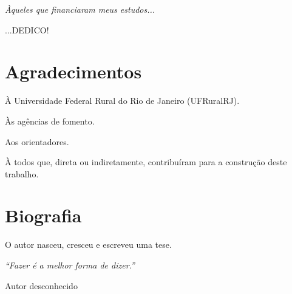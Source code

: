 \documentclass[tese]{UFRuralRJ}
\author{Rural}{Nome da Melhor Estudante da} %
\date{30}{Fevereiro}{2016} %
\begin{document}
\maketitle

\makeapprove

\clearpage\mbox{}\vfill\hspace{80mm}
\begin{minipage}{76mm}
  \begin{flushright}
    {\em
    Àqueles que financiaram meus estudos...
    \par
    ...DEDICO!
    }
  \end{flushright}
\end{minipage}

\chapter*{Agradecimentos}

À Universidade Federal Rural do Rio de Janeiro (UFRuralRJ).

Às agências de fomento.

Aos orientadores.

À todos que, direta ou indiretamente, contribuíram para a construção deste 
trabalho.

\chapter*{Biografia}
O autor nasceu, cresceu e escreveu uma tese.

\clearpage\mbox{}\vfill\hspace{80mm}\begin{minipage}{76mm}\begin{flushright}{\em
``Fazer é a melhor forma de dizer.''
\par
Autor desconhecido
}\end{flushright}\end{minipage}
\end{document}
